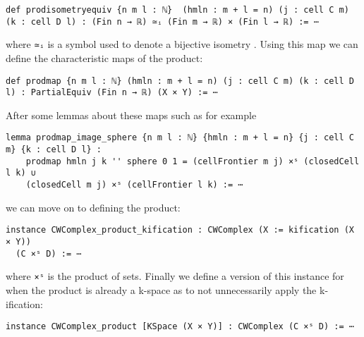 \begin{lstlisting}
def prodisometryequiv {n m l : ℕ}  (hmln : m + l = n) (j : cell C m) (k : cell D l) : (Fin n → ℝ) ≃ᵢ (Fin m → ℝ) × (Fin l → ℝ) := ⋯
\end{lstlisting}

where \lstinline{≃ᵢ} is a symbol used to denote a bijective isometry \href{https://github.com/leanprover-community/mathlib4/blob/ed125a4216d18273cb1b96d4c846d32b85d74faf/Mathlib/Topology/MetricSpace/Isometry.lean#L242-L246}{\faExternalLink}. 
Using this map we can define the characteristic maps of the product: 
\href{https://github.com/scholzhannah/CWComplexes/blob/7be4872a05b534011cc969eb5b80a4b7f0bf57e2/CWcomplexes/Product.lean#L38-L41}{\faExternalLink}

\begin{lstlisting}
def prodmap {n m l : ℕ} (hmln : m + l = n) (j : cell C m) (k : cell D l) : PartialEquiv (Fin n → ℝ) (X × Y) := ⋯
\end{lstlisting}

After some lemmas about these maps such as for example 
\href{https://github.com/scholzhannah/CWComplexes/blob/7be4872a05b534011cc969eb5b80a4b7f0bf57e2/CWcomplexes/Product.lean#L65-L70}{\faExternalLink}

\begin{lstlisting}
lemma prodmap_image_sphere {n m l : ℕ} {hmln : m + l = n} {j : cell C m} {k : cell D l} :
    prodmap hmln j k '' sphere 0 1 = (cellFrontier m j) ×ˢ (closedCell l k) ∪
    (closedCell m j) ×ˢ (cellFrontier l k) := ⋯
\end{lstlisting}

we can move on to defining the product: 
\href{https://github.com/scholzhannah/CWComplexes/blob/7be4872a05b534011cc969eb5b80a4b7f0bf57e2/CWcomplexes/Product.lean#L226-L377}{\faExternalLink}

\begin{lstlisting}
instance CWComplex_product_kification : CWComplex (X := kification (X × Y)) 
  (C ×ˢ D) := ⋯
\end{lstlisting}

where \lstinline{×ˢ} is the product of sets.
Finally we define a version of this instance for when the product is already a k-space as to not unnecessarily apply the k-ification: 
\href{https://github.com/scholzhannah/CWComplexes/blob/7be4872a05b534011cc969eb5b80a4b7f0bf57e2/CWcomplexes/Product.lean#L81-L224}{\faExternalLink}

\begin{lstlisting}
instance CWComplex_product [KSpace (X × Y)] : CWComplex (C ×ˢ D) := ⋯
\end{lstlisting}